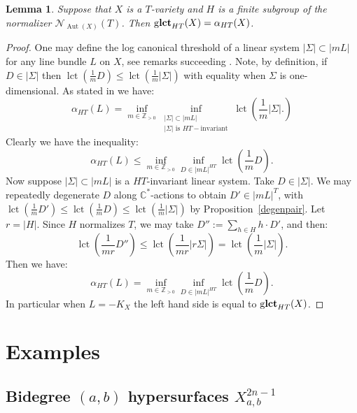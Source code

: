 \documentclass{amsart}
\newtheorem{lemma}[theorem]{Lemma}
\theoremstyle{definition}
\newcommand{\CC}{\mathbb{C}}
\DeclareMathOperator{\Aut}{Aut}
\DeclareMathOperator{\glct}{g\bf{lct}}
\DeclareMathOperator{\lct}{lct}
\begin{document}
\begin{lemma}
Suppose that \(X\) is a \(T\)-variety and \(H\) is a finite subgroup of the normalizer \( \mathcal{N}_{\Aut(X)}(T)\). Then \(\glct_{HT}(X) = \alpha_{HT}(X)\).
\end{lemma}
\begin{proof}
One may define the log canonical threshold of a linear system \(|\Sigma| \subset |mL|\) for any line bundle \(L\) on \(X\), see remarks succeeding \cite[Definition A.2]{cheltsov08}. Note, by definition, if \(D \in |\Sigma|\) then \(\lct(\frac{1}{m} D) \le \lct( \frac{1}{m} |\Sigma|)\) with equality when \(\Sigma\) is one-dimensional. As stated in \cite[(A.1)]{cheltsov08} we have:
\[
\alpha_{HT}(L) = \inf_{m \in \mathbb{Z}_{>0}} \inf_{\substack{|\Sigma| \subset |mL| \\ |\Sigma| \text{ is } HT-\text{invariant}}} \lct ( \frac{1}{m} |\Sigma|. ) 
\]
Clearly we have the inequality:
\[
\alpha_{HT}(L)  \le \inf_{m \in \mathbb{Z}_{>0}} \inf_{D \in |mL|^{HT}} \lct (\frac{1}{m} D).
\]
Now suppose \(|\Sigma| \subset |mL|\) is a \(HT\)-invariant linear system. Take \(D \in |\Sigma|\). We may repeatedly degenerate \(D\) along \(\CC^*\)-actions to obtain \(D' \in |mL|^{T}\), with \(\lct(\frac{1}{m}D') \le \lct(\frac{1}{m}D) \le \lct( \frac{1}{m}|\Sigma|)\) by Proposition~\ref{degenpair}. Let \(r = |H|\). Since \(H\) normalizes \(T\), we may take \(D'':= \sum_{h \in H} h \cdot D'\), and then:
\[
\lct(\frac{1}{m r }D'') \le \lct( \frac{1}{mr} | r\Sigma|) = \lct( \frac{1}{m}|\Sigma|).
\]
Then we have:
\[
\alpha_{HT}(L) = \inf_{m \in \mathbb{Z}_{>0}} \inf_{D \in |mL|^{HT}} \lct (\frac{1}{m} D).
\]
In particular when \(L = -K_X\) the left hand side is equal to \(\glct_{HT}(X)\).
\end{proof}
\section{Examples}
\subsection{Bidegree $(a,b)$ hypersurfaces $X_{a,b}^{2n-1}$} \label{subsec:hypersurfaces} \ \\
\end{document}
